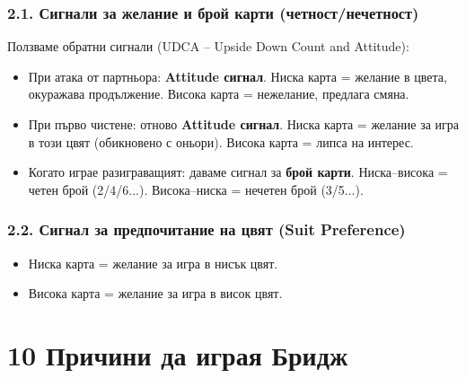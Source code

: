 \documentclass[10pt,a5paper]{extarticle}
\begin{document}
\subsubsection*{2.1. Сигнали за желание и брой карти (четност/нечетност)}
Ползваме обратни сигнали (UDCA – Upside Down Count and Attitude):  
\begin{itemize}
  \item[] При атака от партньора: \textbf{Attitude сигнал}.  
  Ниска карта = желание в цвета, окуражава продължение.  
  Висока карта = нежелание, предлага смяна.
  \item[] При първо чистене: отново \textbf{Attitude сигнал}.  
  Ниска карта = желание за игра в този цвят (обикновено с оньори).  
  Висока карта = липса на интерес.
  \item[] Когато играе разиграващият: даваме сигнал за \textbf{брой карти}.  
  Ниска–висока = четен брой (2/4/6...).  
  Висока–ниска = нечетен брой (3/5...).
\end{itemize}

\subsubsection*{2.2. Сигнал за предпочитание на цвят (Suit Preference)}
\begin{itemize}
  \item[] Ниска карта = желание за игра в нисък цвят.
  \item[] Висока карта = желание за игра в висок цвят.
\end{itemize}
\newpage
\section*{10 Причини да играя Бридж}
\end{document}
